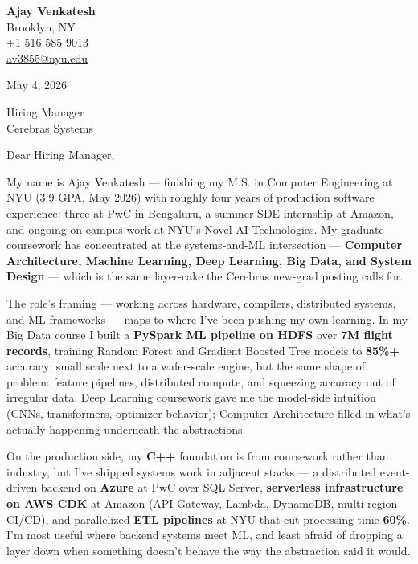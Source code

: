 \documentclass[letterpaper,11pt]{article}
\begin{document}
\begin{flushleft}
\textbf{\large Ajay Venkatesh} \\
Brooklyn, NY \\
+1 516 585 9013 \\
\href{mailto:av3855@nyu.edu}{av3855@nyu.edu}
\end{flushleft}

\vspace{10pt}

May 4, 2026

\vspace{6pt}

Hiring Manager \\
Cerebras Systems

\vspace{10pt}

Dear Hiring Manager,

My name is Ajay Venkatesh --- finishing my M.S. in Computer Engineering at NYU (3.9 GPA, May 2026) with roughly four years of production software experience: three at PwC in Bengaluru, a summer SDE internship at Amazon, and ongoing on-campus work at NYU's Novel AI Technologies. My graduate coursework has concentrated at the systems-and-ML intersection --- \textbf{Computer Architecture, Machine Learning, Deep Learning, Big Data, and System Design} --- which is the same layer-cake the Cerebras new-grad posting calls for.

The role's framing --- working across hardware, compilers, distributed systems, and ML frameworks --- maps to where I've been pushing my own learning. In my Big Data course I built a \textbf{PySpark ML pipeline on HDFS} over \textbf{7M flight records}, training Random Forest and Gradient Boosted Tree models to \textbf{85\%+} accuracy; small scale next to a wafer-scale engine, but the same shape of problem: feature pipelines, distributed compute, and squeezing accuracy out of irregular data. Deep Learning coursework gave me the model-side intuition (CNNs, transformers, optimizer behavior); Computer Architecture filled in what's actually happening underneath the abstractions.

On the production side, my \textbf{C++} foundation is from coursework rather than industry, but I've shipped systems work in adjacent stacks --- a distributed event-driven backend on \textbf{Azure} at PwC over SQL Server, \textbf{serverless infrastructure on AWS CDK} at Amazon (API Gateway, Lambda, DynamoDB, multi-region CI/CD), and parallelized \textbf{ETL pipelines} at NYU that cut processing time \textbf{60\%}. I'm most useful where backend systems meet ML, and least afraid of dropping a layer down when something doesn't behave the way the abstraction said it would.
\end{document}
